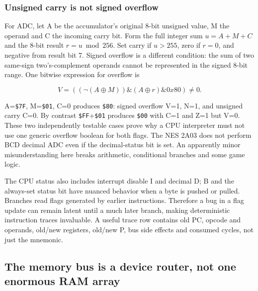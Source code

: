 \subsubsection{Unsigned carry is not signed overflow}\label{06-engine-ii-ch042-unsigned-carry-is-not-signed-overflow}

\hypertarget{06-engine-ii-ch042-unsigned-carry-is-not-signed-overflow}{}

For ADC, let A be the accumulator's original 8-bit unsigned value, M the operand and C the incoming carry bit. Form the full integer sum \(u=A+M+C\) and the 8-bit result \(r=u\bmod256\). Set carry if \(u>255\), zero if \(r=0\), and negative from result bit 7. Signed overflow is a different condition: the sum of two same-sign two's-complement operands cannot be represented in the signed 8-bit range. One bitwise expression for overflow is

\[
V= ((\neg(A\oplus M))\mathbin{\&}(A\oplus r)\mathbin{\&}0x80)\ne0.
\]

A=\texttt{\$7F}, M=\texttt{\$01}, C=0 produces \texttt{\$80}: signed overflow V=1, N=1, and unsigned carry C=0. By contrast \texttt{\$FF}+\texttt{\$01} produces \texttt{\$00} with C=1 and Z=1 but V=0. These two independently testable cases prove why a CPU interpreter must not use one generic overflow boolean for both flags. The NES 2A03 does not perform BCD decimal ADC even if the decimal-status bit is set. An apparently minor misunderstanding here breaks arithmetic, conditional branches and some game logic.

The CPU status also includes interrupt disable I and decimal D; B and the always-set status bit have nuanced behavior when a byte is pushed or pulled. Branches read flags generated by earlier instructions. Therefore a bug in a flag update can remain latent until a much later branch, making deterministic instruction traces invaluable. A useful trace row contains old PC, opcode and operands, old/new registers, old/new P, bus side effects and consumed cycles, not just the mnemonic.

\subsection{The memory bus is a device router, not one enormous RAM array}\label{06-engine-ii-ch042-the-memory-bus-is-a-device-router-not-one-enormous-ram-array}

\hypertarget{06-engine-ii-ch042-the-memory-bus-is-a-device-router-not-one-enormous-ram-array}{}

